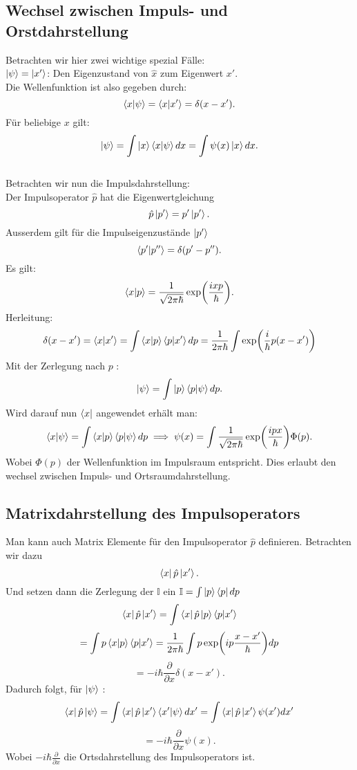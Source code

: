\documentclass{report}
\begin{document}
\subsection{Wechsel zwischen Impuls- und Orstdahrstellung}
Betrachten wir hier zwei wichtige spezial Fälle: \\
$\ket{\psi} = \ket{x'} $: Den Eigenzustand von $\hat{x}$ zum Eigenwert $x'$.\\
Die Wellenfunktion ist also gegeben durch:  \[
	\bra{x} \ket{\psi} = \bra{x} \ket{x'} = \delta(x - x') 
.\] Für beliebige $x$ gilt: \[
\ket{\psi} = \int\ket{x} \bra{x} \ket{\psi} dx = \int \psi(x) \ket{x} dx   
.\] \\
Betrachten wir nun die Impulsdahrstellung: \\
Der Impulsoperator  $\hat{p}$ hat die Eigenwertgleichung \[
\hat{p} \ket{p'} = p' \ket{p'} 
.\] Ausserdem gilt für die Impulseigenzustände $\ket{p'} $ \[
\bra{p'} \ket{p''} = \delta(p' - p'')
.\] Es gilt: 
\[
	\bra{x} \ket{p} = \frac{1}{\sqrt{2 \pi \hbar} } \exp(\frac{ixp}{\hbar})
.\] 
Herleitung: \\
\[
	\delta(x - x') = \bra{x} \ket{x'} = \int \bra{x} \ket{p} \bra{p} \ket{x'} dp \\
	= \frac{1}{2 \pi \hbar} \int \exp(\frac{i}{\hbar} p (x-x'))
\] Mit der Zerlegung nach $p$ : \[
\ket{\psi} = \int \ket{p} \bra{p} \ket{\psi} dp  
.\] Wird darauf nun $\bra{x} $ angewendet erhält man: \[
\bra{x} \ket{\psi} = \int \bra{x} \ket{p}  \bra{p} \ket{\psi} dp \\
\implies \psi(x) = \int \frac{1}{\sqrt{2 \pi \hbar} } \exp(\frac{ipx}{\hbar}) \Phi(p)
.\] Wobei $\Phi(p)$ der Wellenfunktion im Impulsraum entspricht. Dies erlaubt den wechsel zwischen Impuls- und Ortsraumdahrstellung. \\
\subsection{Matrixdahrstellung des Impulsoperators}
Man kann auch Matrix Elemente für den Impulsoperator $\hat{p}$ definieren. Betrachten wir dazu \[
\bra{x} \hat{p} \ket{x'} 
.\] Und setzen dann die Zerlegung der $\mathbb{I}$ ein $\mathbb{I} = \int \ket{p} \bra{p} dp$ \[
\bra{x} \hat{p} \ket{x'} = \int \bra{x} \hat{p} \ket{p} \bra{p} \ket{x'} 
\] \[
= \int p \bra{x} \ket{p} \bra{p} \ket{x'} = \frac{1}{2 \pi \hbar} \int p \exp(i p \frac{x - x'}{\hbar}) dp
\] \[
= -i \hbar \frac{\partial}{\partial x} \delta(x - x')
.\]   Dadurch folgt, für $\ket{\psi} $ : \[
\bra{x} \hat{p} \ket{\psi} = \int \bra{x} \hat{p} \ket{x'} \bra{x'} \ket{\psi} dx' = \int \bra{x} \hat{p} \ket{x'} \psi(x') dx'    
\] \[
= -i \hbar \frac{\partial}{\partial x} \psi(x)
.\] 
 Wobei $-i \hbar \frac{\partial}{\partial x}$ die Ortsdahrstellung des Impulsoperators ist.
\end{document}
